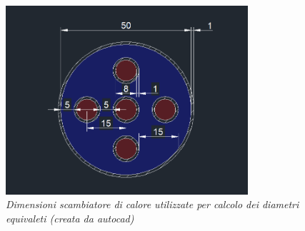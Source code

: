 \documentclass[a4paper,10pt]{article}                                                                                       %
\begin{document}
\begin{figure}[H]                                                                                                           %
  \caption{\textit{Dimensioni scambiatore di calore utilizzate per calcolo dei diametri equivaleti (creata da autocad)}}    %
  \label{fig:he}                                                                                                            %
  \vspace{3mm}                                                                                                              %
  \centering                                                                                                                %
  \includegraphics[width=0.8\textwidth]{../final_doc/code_exports/imgs/heat_exchanger.png}                                  %
\end{figure}                                                                                                                %
\clearpage                                                                                                                  %

\end{document}
